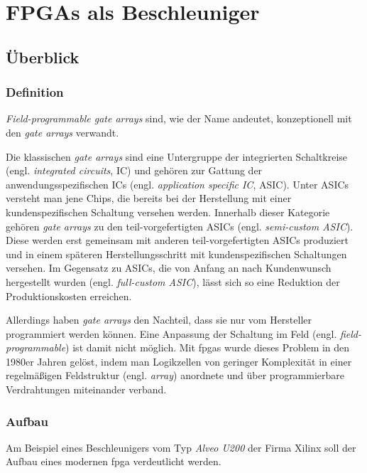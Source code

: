 \chapter{FPGAs als Beschleuniger}

\section{Überblick}

\subsection{Definition}

\textit{Field-programmable gate arrays} sind, wie der Name andeutet,
konzeptionell mit den \textit{gate arrays} verwandt.

Die klassischen \textit{gate arrays} sind eine Untergruppe der integrierten
Schaltkreise (engl. \textit{integrated circuits}, IC) und gehören zur Gattung
der anwendungsspezifischen ICs (engl. \textit{application specific IC}, ASIC).
Unter ASICs versteht man jene Chips, die bereits bei der Herstellung mit einer
kundenspezifischen Schaltung versehen werden. Innerhalb dieser Kategorie gehören
\textit{gate arrays} zu den teil-vorgefertigten ASICs (engl.
\textit{semi-custom ASIC}). Diese werden erst gemeinsam mit anderen
teil-vorgefertigten ASICs produziert und in einem späteren Herstellungsschritt
mit kundenspezifischen Schaltungen versehen. Im Gegensatz zu ASICs, die von
Anfang an nach Kundenwunsch hergestellt wurden (engl.
\textit{full-custom ASIC}), lässt sich so eine Reduktion der Produktionskosten
erreichen. \cite[vgl.][123]{kesel2013}

Allerdings haben \textit{gate arrays} den Nachteil, dass sie nur vom Hersteller
programmiert werden können. Eine Anpassung der Schaltung im Feld (engl.
\textit{field-programmable}) ist damit nicht möglich. Mit \gls{fpga}s wurde
dieses Problem in den 1980er Jahren gelöst, indem man Logikzellen von geringer
Komplexität in einer regelmäßigen Feldstruktur (engl. \textit{array}) anordnete
und über programmierbare Verdrahtungen miteinander verband.
\cite[vgl.][208]{kesel2013} 

\cite{hawkins2010}

\subsection{Aufbau}

Am Beispiel eines Beschleunigers vom Typ \textit{Alveo U200} der Firma Xilinx
soll der Aufbau eines modernen \gls{fpga} verdeutlicht werden.

